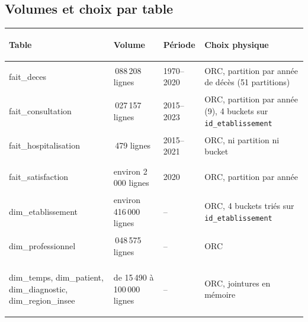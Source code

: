 \subsection{Volumes et choix par table}

\begin{center}
\small
\begin{tabularx}{\textwidth}{>{\bfseries\raggedright\arraybackslash}p{3.6cm} >{\raggedright\arraybackslash}p{2.4cm} l >{\raggedright\arraybackslash}X}
\toprule
Table & Volume & Période & Choix physique \\
\midrule
fait\_deces & 25\,088\,208 lignes & 1970--2020 & ORC, partition par année de décès (51 partitions) \\
fait\_consultation & 1\,027\,157 lignes & 2015--2023 & ORC, partition par année (9), 4 buckets sur \texttt{id\_etablissement} \\
fait\_hospitalisation & 2\,479 lignes & 2015--2021 & ORC, ni partition ni bucket \\
fait\_satisfaction & environ 2\,000 lignes & 2020 & ORC, partition par année \\
dim\_etablissement & environ 416\,000 lignes & -- & ORC, 4 buckets triés sur \texttt{id\_etablissement} \\
dim\_professionnel & 1\,048\,575 lignes & -- & ORC \\
dim\_temps, dim\_patient, dim\_diagnostic, dim\_region\_\allowbreak insee & de 15\,490 à 100\,000 lignes & -- & ORC, jointures en mémoire \\
\bottomrule
\end{tabularx}
\end{center}

